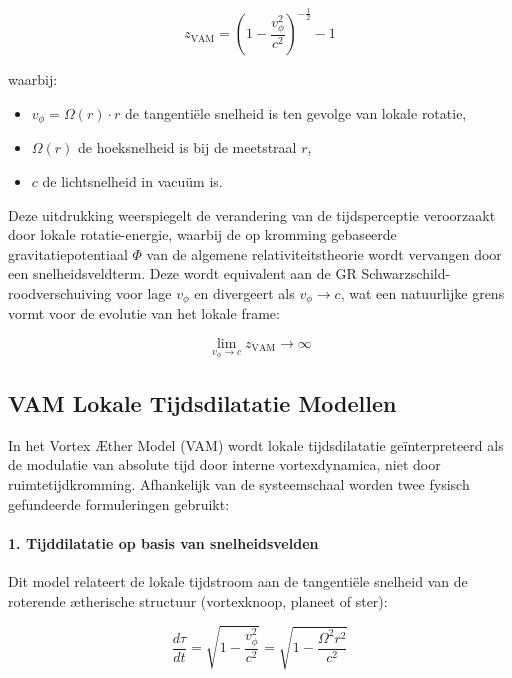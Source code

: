 \begin{equation}
    z_{\text{VAM}} =
    \left( 1 - \frac{v_\phi^2}{c^2} \right)^{-\frac{1}{2}} - 1
\end{equation}

waarbij:
\begin{itemize}
    \item \( v_\phi = \Omega(r) \cdot r \) de tangentiële snelheid is ten gevolge van lokale rotatie,
    \item \( \Omega(r) \) de hoeksnelheid is bij de meetstraal \( r \),
    \item \( c \) de lichtsnelheid in vacuüm is.
\end{itemize}

Deze uitdrukking weerspiegelt de verandering van de tijdsperceptie veroorzaakt door lokale rotatie-energie, waarbij de op kromming gebaseerde gravitatiepotentiaal \( \Phi \) van de algemene relativiteitstheorie wordt vervangen door een snelheidsveldterm. Deze wordt equivalent aan de GR Schwarzschild-roodverschuiving voor lage \( v_\phi \) en divergeert als \( v_\phi \rightarrow c \), wat een natuurlijke grens vormt voor de evolutie van het lokale frame:

\begin{equation}
    \lim_{v_\phi \to c} z_{\text{VAM}} \to \infty
\end{equation}



\subsection*{VAM Lokale Tijdsdilatatie Modellen}

In het Vortex Æther Model (VAM) wordt lokale tijdsdilatatie geïnterpreteerd als de modulatie van absolute tijd door interne vortexdynamica, niet door ruimtetijdkromming. Afhankelijk van de systeemschaal worden twee fysisch gefundeerde formuleringen gebruikt:

\paragraph{1. Tijddilatatie op basis van snelheidsvelden}

Dit model relateert de lokale tijdstroom aan de tangentiële snelheid van de roterende ætherische structuur (vortexknoop, planeet of ster):

\begin{equation}
    \frac{d\tau}{dt} =
    \sqrt{1 - \frac{v_\phi^2}{c^2}} =
    \sqrt{1 - \frac{\Omega^2 r^2}{c^2}}
\end{equation}

